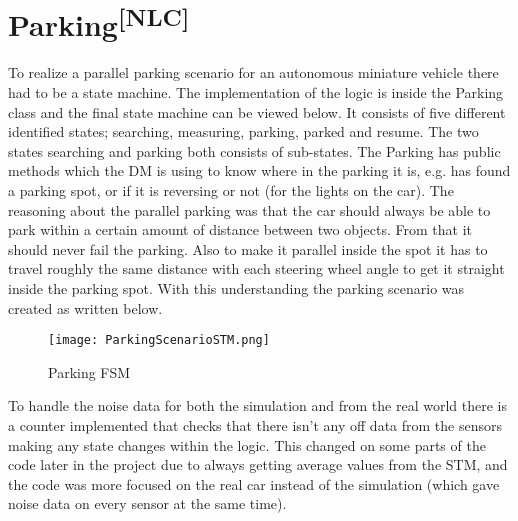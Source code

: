 \section[Parking]{Parking\textsuperscript{[NLC]}}
To realize a parallel parking scenario for an autonomous miniature vehicle there
had to be a state machine. The implementation of the logic is inside the Parking
class and the final state machine can be viewed below. It consists of five
different identified states; searching, measuring, parking, parked and resume.
The two states searching and parking both consists of sub-states. The Parking
has public methods which the DM is using to know where in the parking it is,
e.g. has found a parking spot, or if it is reversing or not (for the lights on
the car). The reasoning about the parallel parking was that the car should
always be able to park within a certain amount of distance between two objects.
From that it should never fail the parking. Also to make it parallel inside the
spot it has to travel roughly the same distance with each steering wheel angle
to get it straight inside the parking spot. With this understanding the parking
scenario was created as written below.
\begin{figure}[ht]
  \centering
  \texttt{[image: ParkingScenarioSTM.png]}
  \caption{Parking FSM}
  \label{otfsmb}
\end{figure}
To handle the noise data for both the simulation and from the real world there
is a counter implemented that checks that there isn't any off data from the
sensors making any state changes within the logic. This changed on some parts of
the code later in the project due to always getting average values from the STM,
and the code was more focused on the real car instead of the simulation (which
gave noise data on every sensor at the same time).\\

